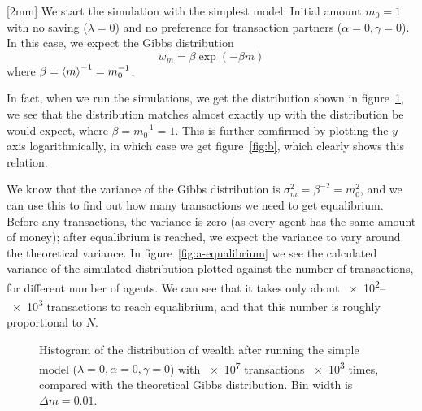 \documentclass[12pt,a4paper]{article}
\newcommand\oppg[1]{\reversemarginnote{\textcolor{black!40}{#1)}}[2mm]}
\begin{document}
\oppg{a,b}
We start the simulation with the simplest model: Initial amount $m_0 = 1$ with no saving ($\lambda = 0$) and no preference for transaction partners ($\alpha = 0, \gamma = 0$). In this case, we expect the Gibbs distribution
\begin{equation}
  w_m = \beta \exp(-\beta m)
\end{equation}
where $\beta = \expval{m}^{-1} = m_0^{-1}$.

In fact, when we run the simulations, we get the distribution shown in figure~\ref{fig:a}, we see that the distribution matches almost exactly up with the distribution be would expect, where $\beta = m_0^{-1} = 1$. This is further comfirmed by plotting the $y$ axis logarithmically, in which case we get figure~\ref{fig:b}, which clearly shows this relation.

We know that the variance of the Gibbs distribution is $\sigma_m^2 = \beta^{-2} = m_0^2$, and we can use this to find out how many transactions we need to get equalibrium. Before any transactions, the variance is zero (as every agent has the same amount of money); after equalibrium is reached, we expect the variance to vary around the theoretical variance.
In figure~\ref{fig:a-equalibrium} we see the calculated variance of the simulated distribution plotted against the number of transactions, for different number of agents. We can see that it takes only about \numrange{e2}{e3} transactions to reach equalibrium, and that this number is roughly proportional to $N$.

\begin{figure}[!ht]
  \centering

  \caption{Histogram of the distribution of wealth after running the simple model ($\lambda = 0, \alpha = 0, \gamma = 0$) with \num{e7} transactions \num{e3} times, compared with the theoretical Gibbs distribution. Bin width is $\Delta{m} = 0.01$.} \label{fig:a}
\end{figure}
\end{document}
